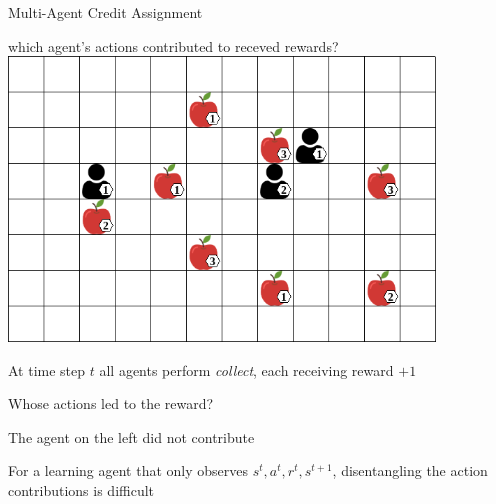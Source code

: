 \begin{frame}{Multi-Agent Credit Assignment}

 which agent's actions contributed to receved rewards? \\[15pt]

\bcol
            \centering
            \includegraphics[width=0.85\textwidth]{images/environments/lbf/foraging_8x12_b.png}

        \blist
            \item At time step $t$ all agents perform \textit{collect}, each receiving reward $+1$
            \item Whose actions led to the reward?
            \item The agent on the left did not contribute
            \item For a learning agent that only observes $s^t, a^t, r^t, s^{t+1}$, disentangling the action contributions is difficult
        \elist

\ecol
    
\end{frame}
